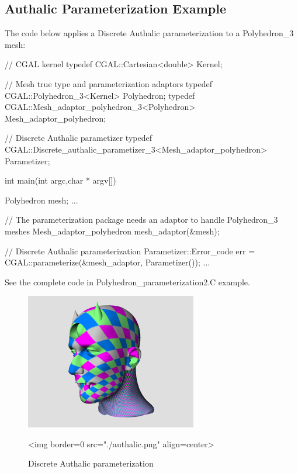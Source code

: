 \subsection{Authalic Parameterization Example}

The code below applies a Discrete Authalic parameterization to a Polyhedron\_3 mesh:

\begin{ccExampleCode}

// CGAL kernel
typedef CGAL::Cartesian<double>                         Kernel;

// Mesh true type and parameterization adaptors
typedef CGAL::Polyhedron_3<Kernel>                      Polyhedron;
typedef CGAL::Mesh_adaptor_polyhedron_3<Polyhedron>     Mesh_adaptor_polyhedron;

// Discrete Authalic parametizer
typedef CGAL::Discrete_authalic_parametizer_3<Mesh_adaptor_polyhedron>
                                                        Parametizer;

int main(int argc,char * argv[])
{
    Polyhedron mesh;
    ...

    // The parameterization package needs an adaptor to handle Polyhedron_3 meshes
    Mesh_adaptor_polyhedron mesh_adaptor(&mesh);

    // Discrete Authalic parameterization
    Parametizer::Error_code err = CGAL::parameterize(&mesh_adaptor, Parametizer());
    ...
}

\end{ccExampleCode}

See the complete code in Polyhedron\_parameterization2.C example.

\begin{figure}[bht]
    \begin{center}
        \begin{ccTexOnly}
            \includegraphics{Parameterization/authalic} %
        \end{ccTexOnly}
        \begin{ccHtmlOnly}
            <img border=0 src="./authalic.png" align=center>
        \end{ccHtmlOnly}
        \label{parameterization-fig-authalic}

        \caption{Discrete Authalic parameterization}
    \end{center}
\end{figure}


